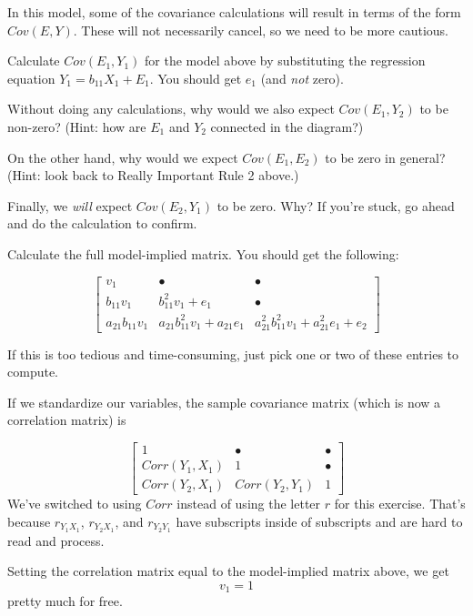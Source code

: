 \documentclass[
]{book}
\begin{document}
In this model, some of the covariance calculations will result in terms of the form \(Cov(E, Y)\). These will not necessarily cancel, so we need to be more cautious.

Calculate \(Cov(E_{1}, Y_{1})\) for the model above by substituting the regression equation \(Y_{1} = b_{11}X_{1} + E_{1}\). You should get \(e_{1}\) (and \emph{not} zero).

Without doing any calculations, why would we also expect \(Cov(E_{1}, Y_{2})\) to be non-zero? (Hint: how are \(E_{1}\) and \(Y_{2}\) connected in the diagram?)

On the other hand, why would we expect \(Cov(E_{1}, E_{2})\) to be zero in general? (Hint: look back to Really Important Rule 2 above.)

Finally, we \emph{will} expect \(Cov(E_{2}, Y_{1})\) to be zero. Why? If you're stuck, go ahead and do the calculation to confirm.

Calculate the full model-implied matrix. You should get the following:

\[
\begin{bmatrix}
v_{1}   &   \bullet &  \bullet  \\
b_{11}v_{1}  &   b_{11}^{2}v_{1} + e_{1}   &  \bullet \\
a_{21}b_{11}v_{1}  &  a_{21}b_{11}^{2}v_{1} + a_{21}e_{1}  &   a_{21}^{2}b_{11}^{2}v_{1} + a_{21}^2e_{1} + e_{2}
\end{bmatrix}
\]

If this is too tedious and time-consuming, just pick one or two of these entries to compute.

If we standardize our variables, the sample covariance matrix (which is now a correlation matrix) is

\[
\begin{bmatrix}
1                   &   \bullet             &   \bullet \\
Corr(Y_{1}, X_{1})  &   1                   &   \bullet \\
Corr(Y_{2}, X_{1})  &   Corr(Y_{2}, Y_{1})   &   1
\end{bmatrix}
\]
We've switched to using \(Corr\) instead of using the letter \(r\) for this exercise. That's because \(r_{Y_{1}X_{1}}\), \(r_{Y_{2}X_{1}}\), and \(r_{Y_{2}Y_{1}}\) have subscripts inside of subscripts and are hard to read and process.

Setting the correlation matrix equal to the model-implied matrix above, we get
\[
v_{1} = 1
\]
pretty much for free.
\end{document}
